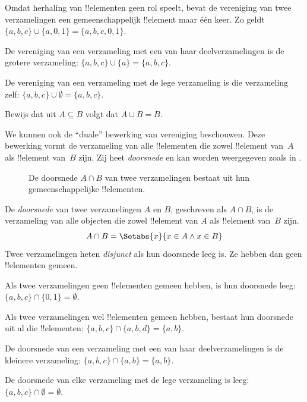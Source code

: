 \documentclass[openany]{memoir}
\begin{document}
\begin{ex}
Omdat herhaling van !!{element}en geen rol speelt, bevat de vereniging van
twee verzamelingen een gemeenschappelijk !!{element} maar één keer. Zo geldt
$\{ a, b, c\} \cup \{ a, 0, 1\} = \{a, b, c, 0, 1\}$.

De vereniging van een verzameling met een van haar deelverzamelingen is
de grotere verzameling: $\{a, b, c \} \cup \{a \} = \{a, b, c\}$.

De vereniging van een verzameling met de lege verzameling is die verzameling
zelf: $\{a, b, c \} \cup \emptyset = \{a, b, c \}$.
\end{ex}

\begin{prob}
Bewijs dat uit $A \subseteq B$ volgt dat $A \cup B = B$.
\end{prob}

\begin{explain}
We kunnen ook de ``duale'' bewerking van vereniging beschouwen. Deze bewerking
vormt de verzameling van alle !!{element}en die zowel !!{element} van~$A$
als !!{element} van~$B$ zijn. Zij heet \emph{doorsnede} en kan worden
weergegeven zoals in .
\begin{figure}
  \caption{De doorsnede $A \cap B$ van twee verzamelingen bestaat uit hun
    gemeenschappelijke !!{element}en.}
\end{figure}
\end{explain}

\begin{defn}[Doorsnede]
De \emph{doorsnede} van twee verzamelingen $A$ en $B$, geschreven als
$A \cap B$, is de verzameling van alle objecten die zowel !!{element} van
$A$ als !!{element} van~$B$ zijn.
\[
A \cap B = \Setabs{x}{x \in A \land x \in B}
\]
Twee verzamelingen heten \emph{disjunct} als hun doorsnede leeg is. Ze hebben
dan geen !!{element}en gemeen.
\end{defn}

\begin{ex}
Als twee verzamelingen geen !!{element}en gemeen hebben, is hun doorsnede leeg:
$\{ a, b, c\} \cap \{ 0, 1\} = \emptyset$.

Als twee verzamelingen wel !!{element}en gemeen hebben, bestaat hun doorsnede
uit al die !!{element}en: $\{a, b, c \} \cap \{a, b, d \} = \{a, b\}$.

De doorsnede van een verzameling met een van haar deelverzamelingen is de
kleinere verzameling: $\{a, b, c\} \cap \{a, b\} = \{a, b\}$.

De doorsnede van elke verzameling met de lege verzameling is leeg: $\{a, b, c \}
\cap \emptyset = \emptyset$.
\end{ex}
\end{document}
